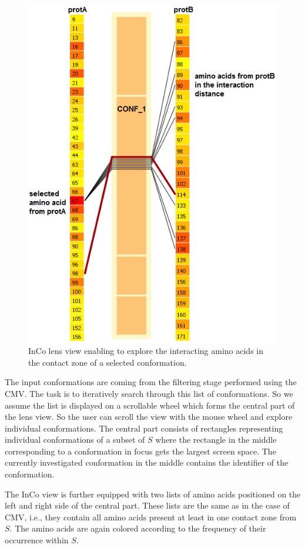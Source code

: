 \documentclass[journal]{vgtc}                %
\begin{document}
\begin{figure}[bt]
  \centering
  \includegraphics[width=0.8\columnwidth]{inco.png}
  \caption{InCo lens view enabling to explore the interacting amino acids in the contact zone of a selected conformation.}
  \label{fig:inco}
\end{figure}

The input conformations are coming from the filtering stage performed using the CMV.
The task is to iteratively search through this list of conformations.
So we assume the list is displayed on a scrollable wheel which forms the central part of the lens view. 
So the user can scroll the view with the mouse wheel and explore individual conformations.
The central part consists of rectangles representing individual conformations of a subset of $S$ where the rectangle in the middle corresponding to a conformation in focus gets the largest screen space.
The currently investigated conformation in the middle contains the identifier of the conformation.

The InCo view is further equipped with two lists of amino acids positioned on the left and right side of the central part.
These lists are the same as in the case of CMV, i.e., they contain all amino acids present at least in one contact zone from $S$.
The amino acids are again colored according to the frequency of their occurrence within $S$.
\end{document}
